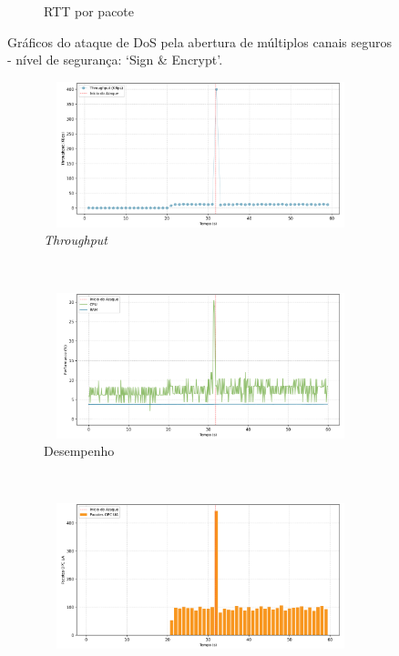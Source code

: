 \begin{apendicesenv}
\begin{figure}[htbp!]
\begin{subfigure}[t]{0.5\textwidth}
        \caption{RTT por pacote}
    \end{subfigure}%
    \label{fig:2-dos_open_multiple_secure_channels}
    \caption{Gráficos do ataque de DoS pela abertura de múltiplos canais seguros - nível de segurança: `Sign \& Encrypt'.}
\end{figure}

\begin{figure}[htbp!]
    \centering
    \begin{subfigure}[t]{0.5\textwidth}
        \centering
        \includegraphics[width=1\textwidth, height=120pt]{USPSC-img/output/cropped/0-dos_translate_browse_path_call_stack_overflow-tput.png}
        \caption{\textit{Throughput}}
    \end{subfigure}%
    ~ 
    \begin{subfigure}[t]{0.5\textwidth}
        \centering
        \includegraphics[width=1\textwidth, height=120pt]{USPSC-img/output/cropped/0-dos_translate_browse_path_call_stack_overflow-perf.png}
        \caption{Desempenho}
    \end{subfigure}%
    \\
    \begin{subfigure}[t]{0.5\textwidth}
        \centering
        \includegraphics[width=1\textwidth, height=120pt]{USPSC-img/output/cropped/0-dos_translate_browse_path_call_stack_overflow-pack.png}

\end{subfigure}
\end{figure}
\end{apendicesenv}
